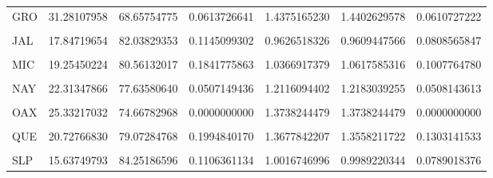 \documentclass[
]{article}
\begin{document}
\begin{table}[H]
\begin{tabular}[t]{lrrrrrr}
GRO & 31.28107958 & 68.65754775 & 0.0613726641 & 1.4375165230 & 1.4402629578 & 0.0610727222\\
\cellcolor{gray!6}{HID} & \cellcolor{gray!6}{16.02284381} & \cellcolor{gray!6}{83.88642674} & \cellcolor{gray!6}{0.0907294511} & \cellcolor{gray!6}{0.9930538975} & \cellcolor{gray!6}{0.9921498463} & \cellcolor{gray!6}{0.0644212040}\\
JAL & 17.84719654 & 82.03829353 & 0.1145099302 & 0.9626518326 & 0.9609447566 & 0.0808565847\\
\cellcolor{gray!6}{MEX} & \cellcolor{gray!6}{18.40064484} & \cellcolor{gray!6}{81.43797833} & \cellcolor{gray!6}{0.1613768268} & \cellcolor{gray!6}{1.0401216644} & \cellcolor{gray!6}{1.0441224162} & \cellcolor{gray!6}{0.0818720661}\\
\addlinespace
MIC & 19.25450224 & 80.56132017 & 0.1841775863 & 1.0366917379 & 1.0617585316 & 0.1007764780\\
\cellcolor{gray!6}{MOR} & \cellcolor{gray!6}{18.36703083} & \cellcolor{gray!6}{81.57168568} & \cellcolor{gray!6}{0.0612834849} & \cellcolor{gray!6}{1.1521323133} & \cellcolor{gray!6}{1.1520266693} & \cellcolor{gray!6}{0.0612800484}\\
NAY & 22.31347866 & 77.63580640 & 0.0507149436 & 1.2116094402 & 1.2183039255 & 0.0508143613\\
\cellcolor{gray!6}{NLE} & \cellcolor{gray!6}{11.59335771} & \cellcolor{gray!6}{88.28131378} & \cellcolor{gray!6}{0.1253285175} & \cellcolor{gray!6}{1.0141366495} & \cellcolor{gray!6}{1.0150154615} & \cellcolor{gray!6}{0.0727745498}\\
OAX & 25.33217032 & 74.66782968 & 0.0000000000 & 1.3738244479 & 1.3738244479 & 0.0000000000\\
\addlinespace
\cellcolor{gray!6}{PUE} & \cellcolor{gray!6}{23.92025046} & \cellcolor{gray!6}{76.03423785} & \cellcolor{gray!6}{0.0455116972} & \cellcolor{gray!6}{1.4095637862} & \cellcolor{gray!6}{1.4076675669} & \cellcolor{gray!6}{0.0456509261}\\
QUE & 20.72766830 & 79.07284768 & 0.1994840170 & 1.3677842207 & 1.3558211722 & 0.1303141533\\
\cellcolor{gray!6}{ROO} & \cellcolor{gray!6}{24.49633602} & \cellcolor{gray!6}{75.24793037} & \cellcolor{gray!6}{0.2557336114} & \cellcolor{gray!6}{1.5660673312} & \cellcolor{gray!6}{1.5736470468} & \cellcolor{gray!6}{0.1179642123}\\
SLP & 15.63749793 & 84.25186596 & 0.1106361134 & 1.0016746996 & 0.9989220344 & 0.0789018376\\

\end{tabular}
\end{table}
\end{document}
